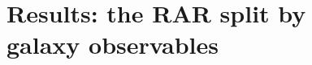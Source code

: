 \documentclass[usenatbib]{mnras}
\newcommand{\hMpc}{\, h^{-1}{\rm{Mpc}} }
\newcommand{\mpss}{ {\rm m}\,{\rm s}^{-2} }
\newcommand{\un}[1]{_{\rm #1}}
\begin{document}

\section{Results: the RAR split by \\ galaxy observables}
\label{sec:results-observables}
\end{document}

